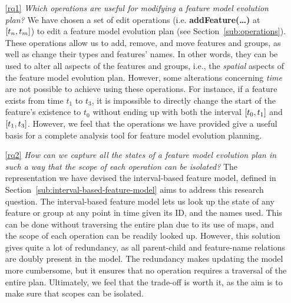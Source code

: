\begin{enumerate}

   \item[\ref{rq1}] \textit{Which operations are useful for modifying a feature model evolution plan?} 
      We have chosen a set of edit operations (i.e. \textbf{addFeature(\ldots)} at $\interval{t_n}{t_m}$) to edit a feature model evolution plan (see Section~\vref{sub:operations}). These operations allow us to add, remove, and move features and groups, as well as change their types and features' names. In other words, they can be used to alter all aspects of the features and groups, i.e., the \emph{spatial} aspects of the feature model evolution plan. However, some alterations concerning \emph{time} are not possible to achieve using these operations. For instance, if a feature exists from time $t_1$ to $t_3$, it is impossible to directly change the start of the feature's existence to $t_0$ without ending up with both the interval $\interval{t_0}{t_1}$ and $\interval{t_1}{t_3}$. However, we feel that the operations we have provided give a useful basis for a complete analysis tool for feature model evolution planning. 

   \item[\ref{rq2}]\textit{How can we capture all the states of a feature model evolution plan in such a way that the scope of each operation can be isolated?} 
      The representation we have devised \textemdash{} the interval-based feature model, defined in Section~\vref{sub:interval-based-feature-model} \textemdash{} aims to address this research question. The interval-based feature model lets us look up the state of any feature or group at any point in time given its ID, and the names used. This can be done without traversing the entire plan due to its use of maps, and the scope of each operation can be readily looked up. However, this solution gives quite a lot of redundancy, as all parent-child and feature-name relations are doubly present in the model. The redundancy makes updating the model more cumbersome, but it ensures that no operation requires a traversal of the entire plan. Ultimately, we feel that the trade-off is worth it, as the aim is to make sure that scopes can be isolated.


\end{enumerate}

